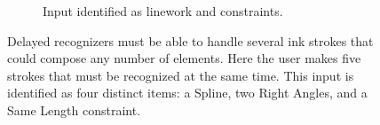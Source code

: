 \begin{figure}
\begin{subfigure}[t]{0.26\textwidth}
    \caption{Input identified as linework and constraints.}
    \label{fig:delayed-example-3}
  \end{subfigure}
  \caption[Delayed recognizer example]{Delayed recognizers must be
    able to handle several ink strokes that could compose any number
    of elements. Here the user makes five strokes that must be
    recognized at the same time. This input is identified as four
    distinct items: a Spline, two Right Angles, and a Same Length
    constraint. }
  \label{fig:fig-delayed-example}
\end{figure}
